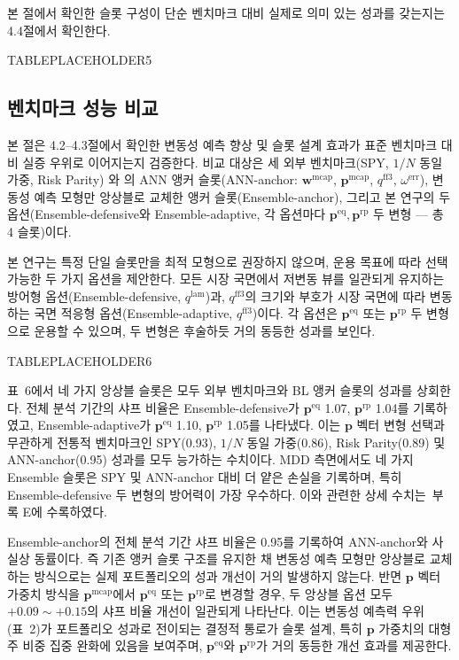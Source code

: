 \documentclass{article}
\begin{document}
본 절에서 확인한 슬롯 구성이 단순 벤치마크 대비 실제로 의미 있는 성과를 갖는지는 4.4절에서 확인한다.



TABLEPLACEHOLDER5



\subsection{벤치마크 성능 비교}\label{subsec:benchmark}

본 절은 4.2--4.3절에서 확인한 변동성 예측 향상 및 슬롯 설계 효과가 표준 벤치마크 대비 실증 우위로 이어지는지 검증한다. 비교 대상은 세 외부 벤치마크(SPY, $1/N$ 동일 가중, Risk Parity) 와 \citet{pyo2018}의 ANN 앵커 슬롯(ANN-anchor: $\mathbf{w}^{\mathrm{mcap}}$, $\mathbf{p}^{\mathrm{mcap}}$, $q^{\mathrm{ff3}}$, $\omega^{\mathrm{err}}$), 변동성 예측 모형만 앙상블로 교체한 앵커 슬롯(Ensemble-anchor), 그리고 본 연구의 두 옵션(Ensemble-defensive와 Ensemble-adaptive, 각 옵션마다 $\mathbf{p}^{\mathrm{eq}}, \mathbf{p}^{\mathrm{rp}}$ 두 변형 — 총 4 슬롯)이다.


본 연구는 특정 단일 슬롯만을 최적 모형으로 권장하지 않으며, 운용 목표에 따라 선택 가능한 두 가지 옵션을 제안한다. 모든 시장 국면에서 저변동 뷰를 일관되게 유지하는 방어형 옵션(Ensemble-defensive, $q^{\mathrm{lam}}$)과, $q^{\mathrm{ff3}}$의 크기와 부호가 시장 국면에 따라 변동하는 국면 적응형 옵션(Ensemble-adaptive, $q^{\mathrm{ff3}}$)이다. 각 옵션은 $\mathbf{p}^{\mathrm{eq}}$ 또는 $\mathbf{p}^{\mathrm{rp}}$ 두 변형으로 운용할 수 있으며, 두 변형은 후술하듯 거의 동등한 성과를 보인다.



TABLEPLACEHOLDER6



표~6에서 네 가지 앙상블 슬롯은 모두 외부 벤치마크와 BL 앵커 슬롯의 성과를 상회한다. 전체 분석 기간의 샤프 비율은 Ensemble-defensive가 $\mathbf{p}^{\mathrm{eq}}$ 1.07, $\mathbf{p}^{\mathrm{rp}}$ 1.04를 기록하였고, Ensemble-adaptive가 $\mathbf{p}^{\mathrm{eq}}$ 1.10, $\mathbf{p}^{\mathrm{rp}}$ 1.05를 나타냈다. 이는 $\mathbf{p}$ 벡터 변형 선택과 무관하게 전통적 벤치마크인 SPY(0.93), $1/N$ 동일 가중(0.86), Risk Parity(0.89) 및 ANN-anchor(0.95) 성과를 모두 능가하는 수치이다. MDD 측면에서도 네 가지 Ensemble 슬롯은 SPY 및 ANN-anchor 대비 더 얕은 손실을 기록하며, 특히 Ensemble-defensive 두 변형의 방어력이 가장 우수하다. 이와 관련한 상세 수치는~부록 E에 수록하였다.

Ensemble-anchor의 전체 분석 기간 샤프 비율은 0.95를 기록하여 ANN-anchor와 사실상 동률이다. 즉 기존 앵커 슬롯 구조를 유지한 채 변동성 예측 모형만 앙상블로 교체하는 방식으로는 실제 포트폴리오의 성과 개선이 거의 발생하지 않는다. 반면 $\mathbf{p}$ 벡터 가중치 방식을 $\mathbf{p}^{\mathrm{mcap}}$에서 $\mathbf{p}^{\mathrm{eq}}$ 또는 $\mathbf{p}^{\mathrm{rp}}$로 변경할 경우, 두 앙상블 옵션 모두 $+0.09 \sim +0.15$의 샤프 비율 개선이 일관되게 나타난다. 이는 변동성 예측력 우위(표~2)가 포트폴리오 성과로 전이되는 결정적 통로가 슬롯 설계, 특히 $\mathbf{p}$ 가중치의 대형주 비중 집중 완화에 있음을 보여주며, $\mathbf{p}^{\mathrm{eq}}$와 $\mathbf{p}^{\mathrm{rp}}$가 거의 동등한 개선 효과를 제공한다.
\end{document}
